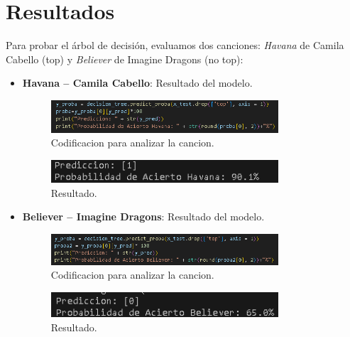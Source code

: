 \documentclass[a4paper,12pt]{article}
\begin{document}
\section{Resultados}
Para probar el árbol de decisión, evaluamos dos canciones: \textit{Havana} de Camila Cabello (top) y \textit{Believer} de Imagine Dragons (no top):

\begin{itemize}
    \item \textbf{Havana – Camila Cabello}: Resultado del modelo.
    \begin{figure}[H]
        \centering
        \includegraphics[width=0.8\textwidth]{31.png}
        \caption{Codificacion para analizar la cancion.}

    \end{figure}

    \begin{figure}[H]
        \centering
        \includegraphics[width=0.8\textwidth]{32.png}
        \caption{Resultado.}

    \end{figure}

    \item \textbf{Believer – Imagine Dragons}: Resultado del modelo.
    \begin{figure}[H]
        \centering
        \includegraphics[width=0.8\textwidth]{33.png}
        \caption{Codificacion para analizar la cancion.}

    \end{figure}

    \begin{figure}[H]
        \centering
        \includegraphics[width=0.8\textwidth]{34.png}
        \caption{Resultado.}

    \end{figure}
\end{itemize}
\end{document}

